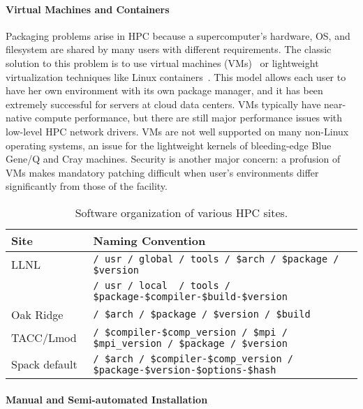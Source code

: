 \paragraph{Virtual Machines and Containers}

Packaging problems arise in HPC because a supercomputer's hardware, OS, and
filesystem are shared by many users with different requirements.  The classic solution
to this problem is to use virtual
machines (VMs)~\cite{barham2003xen,rosenblum1999vmware,smith2005architecture}
or lightweight virtualization techniques like Linux 
containers~\cite{felter2014updated,merkel2014docker}. This model allows each user to 
have her own environment with its own package manager, and it has been extremely 
successful for servers at cloud data centers.  VMs typically have 
near-native compute performance, but there are still major performance issues with
low-level HPC network drivers.  VMs are not well supported on many
non-Linux operating systems, an issue for the lightweight 
kernels of bleeding-edge Blue Gene/Q and Cray machines. Security
is another major concern: a profusion of VMs makes mandatory patching
difficult when user's environments differ significantly from those of the facility.

\begin{table*}\centering
\begin{tabular}{|l|l|}
\hline
Site           & Naming Convention \\
\hline
\hline
LLNL       & {\tt / usr / global / tools / \$arch / \$package / \$version} \\
           & {\tt / usr / local~ / tools / \$package-\$compiler-\$build-\$version } \\
\hline
Oak Ridge~\cite{jones+:cug08}  & {\tt / \$arch / \$package / \$version / \$build} \\
\hline
TACC/Lmod~\cite{mclay:lmod-tutorial}& {\tt / \$compiler-\$comp\_version / \$mpi / \$mpi\_version / \$package / \$version} \\
\hline
\hline
Spack default                  & {\tt / \$arch / \$compiler-\$comp\_version / \$package-\$version-\$options-\$hash} \\
\hline
\end{tabular}
\caption{
	Software organization of various HPC sites.
	\label{tab:naming-conventions}
}
\end{table*}

\paragraph{Manual and Semi-automated Installation}

